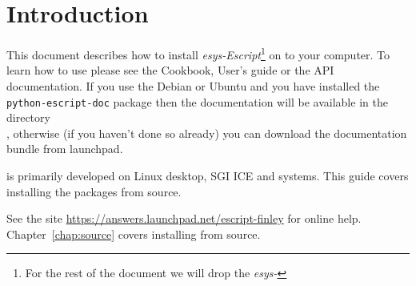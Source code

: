 %
%
%

\chapter{Introduction}
This document describes how to install \emph{esys-Escript}\footnote{For the rest of the document we will drop the \emph{esys-}} on to your computer.
To learn how to use \esfinley please see the Cookbook, User's guide or the API documentation.
If you use the Debian or Ubuntu and you have installed the \texttt{python-escript-doc} package then the documentation 
will be available in the directory\\
, otherwise (if you haven't done so already) you can download the documentation bundle 
from launchpad.



\esfinley is primarily developed on Linux desktop, SGI ICE and \macosx systems.
This guide covers installing the packages from source.

See the site \url{https://answers.launchpad.net/escript-finley} for online help.
Chapter~\ref{chap:source} covers installing from source.



